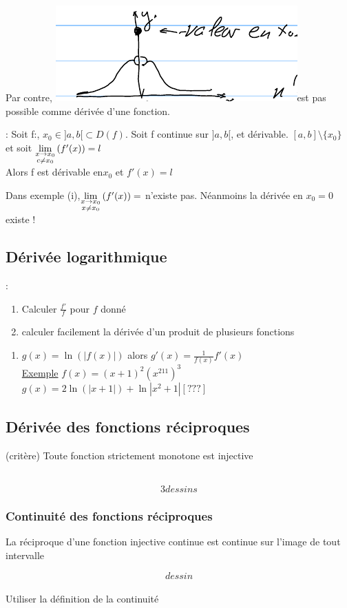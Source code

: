 \documentclass[12pt,a4paper]{article}
\newcommand{\Exemple}{\underline{Exemple} }
\begin{document}
{Par contre, \includegraphics[scale=0.5]{illustrations_Analyse/pas_possible}est pas possible comme dérivée d'une fonction.
\begin{boite}
	\Theoreme : Soit f:\rtor, $x_0 \in ]a,b[ \subset D(f)$. Soit f continue sur $]a,b[$, et dérivable. $[a,b]\setminus\{x_0\}$ et soit $\lim\limits_{\substack{x \to x_0 \\ c \neq x_0}}\left(f'(x)\right) = l$\\
	Alors f est dérivable en$x_0$ et $f'(x) 
	= l$
\end{boite}
 Dans exemple (i),$\lim\limits_{\substack{x \to x_0 \\ x \neq x_0}}\left( f'(x)\right)=$ n'existe pas. Néanmoins la dérivée en $x_0 = 0$ existe !
\subsection{Dérivée logarithmique}
 :
\begin{enumerate}[label=\roman*.]
	\item Calculer $\frac{f'}{f}$ pour $f$ donné
	\item calculer facilement la dérivée d'un produit de plusieurs fonctions	
\end{enumerate}
\begin{enumerate}[label=\roman*.]
	\item $g(x) = \ln(|f(x)|)$ alors $g'(x) = \frac{1}{f(x)}f'(x)$\\
	\Exemple $f(x) = (x+1)^2(x^211)^3$\\
	$g(x) = 2\ln(|x+1|) + \ln|x^2+1| [???]$
\end{enumerate}
\subsection{Dérivée des fonctions réciproques}
\begin{boite}
	 (critère) Toute fonction strictement monotone est injective
\end{boite}
\\
\[3dessins\]
\subsubsection{Continuité des fonctions réciproques}
\begin{boite}
	\Theoreme La réciproque d'une fonction injective continue est continue sur l'image de tout intervalle
\end{boite}
\[dessin\]\\
 Utiliser la définition de la continuité
}
\end{document}

